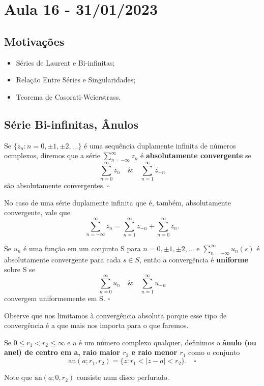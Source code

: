 \documentclass[ComplexAnalysis/complex.tex]{subfiles}
\begin{document}
\section{Aula 16 - 31/01/2023}
\subsection{Motivações}
\begin{itemize}
	\item Séries de Laurent e Bi-infinitas;
	\item Relação Entre Séries e Singularidades;
	\item Teorema de Casorati-Weierstrass.
\end{itemize}
\subsection{Série Bi-infinitas, Ânulos}
\begin{def*}
	Se \(\{z_{n}:n = 0, \pm1, \pm2, \dotsc \}\) é uma sequência duplamente infinita de números ocmplexos, diremos
	que a série \(\sum\limits_{n=-\infty}^{\infty}z_{n}\) é \textbf{absolutamente convergente} se
	\[
		\sum\limits_{n=0}^{\infty}z_{n}\quad\&\quad \sum\limits_{n=1}^{\infty}z_{-n}
	\]
	são absolutamente convergentes. \(\square\)
\end{def*}
No caso de uma série duplamente infinita que é, também, absolutamente convergente, vale que
\[
	\sum\limits_{n=-\infty}^{\infty}z_{n} = \sum\limits_{n=1}^{\infty}z_{-n} + \sum\limits_{n=0}^{\infty}z_{n}.
\]
\begin{def*}
	Se \(u_{n}\) é uma função em um conjunto S para \(n=0, \pm1, \pm2, \dotsc \) e \( \sum\limits_{n=-\infty}^{\infty}u_{n}(s)\) é absolutamente convergente
	para cada \(s\in S\), então a convergência é \textbf{uniforme} sobre S se
	\[
		\sum\limits_{n=0}^{\infty}u_{n}\quad\&\quad \sum\limits_{n=1}^{\infty}u_{-n}
	\]
	convergem uniformemente em S. \(\square\)
\end{def*}
Observe que nos limitamos à convergência absoluta porque esse tipo de convergência é a que mais nos importa
para o que faremos.
\begin{def*}
	Se \(0\leq r_{1}<r_{2}\leq \infty\) e a é um número complexo qualquer, definimos
	o \textbf{ânulo (ou anel) de centro em a, raio maior \(r_{2}\) e raio menor \(r_{1}\)} como o conjunto
	\[
		\mathrm{an}(a; r_{1}, r_{2}) = \{z: r_{1} < |z-a| < r_{2}\}.\quad \square
	\]
\end{def*}
Note que \(\mathrm{an}(a; 0, r_{2})\) consiste num disco perfurado.
\end{document}
